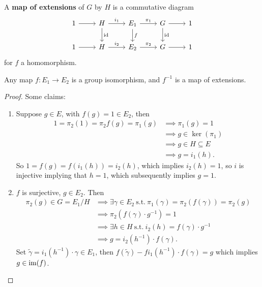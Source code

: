 \begin{definition}[]
    A \textbf{map of extensions} of $G$ by $H$ is a commutative diagram \[
    \begin{tikzcd}
        1\arrow[r] & H \arrow[d,"\id"]\arrow[r,"i_1"] & E_1 \arrow[r,"\pi_1"]\arrow[d,"f"] & G \arrow[r]\arrow[d,"\id"] & 1\\
        1\arrow[r] & H \arrow[r,"i_2"] & E_2 \arrow[r,"\pi_2"] & G\arrow[r] & 1
    \end{tikzcd}
    \]for $f$ a homomorphism. 
\end{definition}
\begin{lemma}
    Any map $f \colon E_1 \to E_2$ is a group isomorphism, and $f ^{-1}$ is a map of extensions.  
\end{lemma}
\begin{proof}
    Some claims:
    \begin{enumerate}[label=(\arabic*)]
    \setlength\itemsep{-.2em}
\item Suppose $g \in E$, with $f(g)=1 \in E_2$, then 
    \begin{align*}
        1= \pi_2(1)=\pi_2f(g)=\pi_1(g)& \implies \pi_1(g)=1\\
                                      &\implies g \in \ker(\pi_1)\\
                                      &\implies  g \in H \subseteq E\\
                                      &\implies g= i_1(h).
    \end{align*}So $1=f(g)=f(i_1(h))=i_2(h)$, which implies $i_2(h)=1$, so $i$ is injective implying that $h=1$, which subsequently implies $g=1$.
\item $f$ is surjective, $g \in E_2$. Then 
    \begin{align*}
        \pi_2(g) \in G = E_1 /H & \implies \exists \gamma  \in E_2 \ \text{s.t.} \ \pi_1(\gamma ) =\pi_2(f(\gamma )) =\pi_2(g)\\
                                &\implies \pi_2(f(\gamma )\cdot g ^{-1})=1 \\
                                &\implies \exists h \in H \ \text{s.t.} \ i_2(h)=f(\gamma )\cdot g ^{-1}\\
                                &\implies g=i_2(h ^{-1} ) \cdot f(\gamma ).
    \end{align*}Set $\widetilde  \gamma  = i_1(h ^{-1}) \cdot \gamma  \in E_1$, then $f(\widetilde \gamma )-f i_1(h ^{-1})\cdot f(\gamma )=g $ which implies $g \in \operatorname{im}(f)$.\qedhere
    \end{enumerate}
\end{proof}
